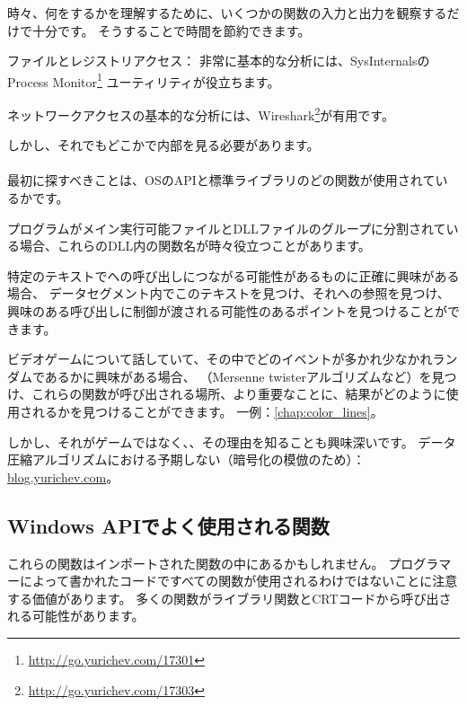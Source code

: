 
時々、何をするかを理解するために、いくつかの関数の入力と出力を観察するだけで十分です。
そうすることで時間を節約できます。

ファイルとレジストリアクセス：
非常に基本的な分析には、SysInternalsのProcess Monitor\footnote{\url{http://go.yurichev.com/17301}}
ユーティリティが役立ちます。

ネットワークアクセスの基本的な分析には、Wireshark\footnote{\url{http://go.yurichev.com/17303}}が有用です。

しかし、それでもどこかで内部を見る必要があります。\\
\\
最初に探すべきことは、\ac{OS}の\ac{API}と標準ライブラリのどの関数が使用されているかです。

プログラムがメイン実行可能ファイルとDLLファイルのグループに分割されている場合、これらのDLL内の関数名が時々役立つことがあります。

特定のテキストでへの呼び出しにつながる可能性があるものに正確に興味がある場合、
データセグメント内でこのテキストを見つけ、それへの参照を見つけ、興味のある呼び出しに制御が渡される可能性のあるポイントを見つけることができます。

ビデオゲームについて話していて、その中でどのイベントが多かれ少なかれランダムであるかに興味がある場合、
（Mersenne twisterアルゴリズムなど）を見つけ、これらの関数が呼び出される場所、より重要なことに、結果がどのように使用されるかを見つけることができます。
一例：\ref{chap:color_lines}。

しかし、それがゲームではなく、、その理由を知ることも興味深いです。
データ圧縮アルゴリズムにおける予期しない（暗号化の模倣のため）：
\href{http://go.yurichev.com/17221}{blog.yurichev.com}。

\subsection{Windows APIでよく使用される関数}

これらの関数はインポートされた関数の中にあるかもしれません。
プログラマーによって書かれたコードですべての関数が使用されるわけではないことに注意する価値があります。
多くの関数がライブラリ関数と\ac{CRT}コードから呼び出される可能性があります。

